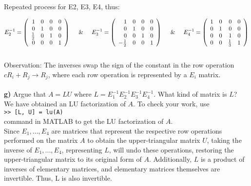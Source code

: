 \documentclass{article}
\begin{document}
Repeated process for E2, E3, E4, thus:

\[
E_2^{-1} = 
\left(
\begin{array}{rrrr}
1 & 0 & 0 & 0 \\
0 & 1 & 0 & 0 \\
\frac{1}{2} & 0 & 1 & 0 \\
0 & 0 & 0 & 1 
\end{array}
\right)
\hspace{0.5cm} \& \hspace{0.5cm}
E_3^{-1} = 
\left(
\begin{array}{rrrr}
1 & 0 & 0 & 0 \\
0 & 1 & 0 & 0 \\
0 & 0 & 1 & 0 \\
-\frac{1}{2} & 0 & 0 & 1 
\end{array}
\right)
\hspace{0.5cm} \& \hspace{0.5cm}
E_4^{-1} = 
\left(
\begin{array}{rrrr}
1 & 0 & 0 & 0 \\
0 & 1 & 0 & 0 \\
0 & 0 & 1 & 0 \\
0 & 0 & \frac{1}{3} & 1 
\end{array}
\right)
\]\\

Observation: The inverses swap the sign of the constant in the row operation $cR_i + R_j \rightarrow R_j$, where each row operation is represented by a $E_i$ matrix.\\\\

{\bf g)} Argue that $A = LU$ where $L= E_1^{-1}E_2^{-1} E_3^{-1}E_4^{-1}$. What
kind of matrix is $L$? \\
We have obtained
an LU factorization of $A$. To check your work, use \\
{\tt >> [L, U] = lu(A)} \\
command in MATLAB to get the LU factorization of $A$. \\

Since $E_1, ..., E_4$ are matrices that represent the respective row operations performed on the matrix $A$ to obtain the upper-triangular matrix $U$, taking the inverse of $E_1, ..., E_4$, representing $L$, will undo these operations, restoring the upper-triangular matrix to its original form of $A$. Additionally, $L$ is a product of inverses of elementary matrices, and elementary matrices themselves are invertible. Thus, L is also invertible.\\\\\\\\
\end{document}
